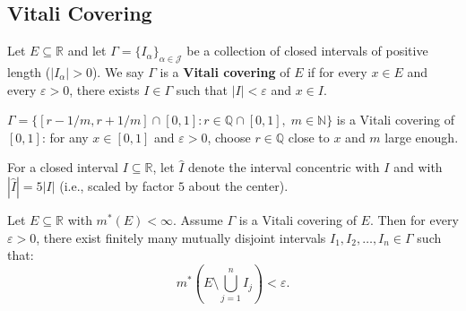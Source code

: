 \documentclass[11pt]{report}
\begin{document}
\subsection{Vitali Covering}

\begin{defbox}
Let $E \subseteq \mathbb{R}$ and let $\Gamma = \{I_\alpha\}_{\alpha \in \mathcal{J}}$ be a collection of closed intervals of positive length ($|I_\alpha| > 0$). We say $\Gamma$ is a \textbf{Vitali covering} of $E$ if for every $x \in E$ and every $\varepsilon > 0$, there exists $I \in \Gamma$ such that $|I| < \varepsilon$ and $x \in I$.
\end{defbox}

\begin{exbox}
$\Gamma = \{[r - 1/m, r + 1/m] \cap [0,1] : r \in \mathbb{Q} \cap [0,1],\; m \in \mathbb{N}\}$ is a Vitali covering of $[0, 1]$: for any $x \in [0,1]$ and $\varepsilon > 0$, choose $r \in \mathbb{Q}$ close to $x$ and $m$ large enough.
\end{exbox}

\begin{rembox}[Notation]
For a closed interval $I \subseteq \mathbb{R}$, let $\hat{I}$ denote the interval concentric with $I$ and with $|\hat{I}| = 5|I|$ (i.e., scaled by factor $5$ about the center).
\end{rembox}

\begin{thmbox}
Let $E \subseteq \mathbb{R}$ with $m^*(E) < \infty$. Assume $\Gamma$ is a Vitali covering of $E$. Then for every $\varepsilon > 0$, there exist finitely many mutually disjoint intervals $I_1, I_2, \ldots, I_n \in \Gamma$ such that:
\[
m^*\!\left(E \setminus \bigcup_{j=1}^{n} I_j\right) < \varepsilon.
\]
\end{thmbox}
\end{document}
